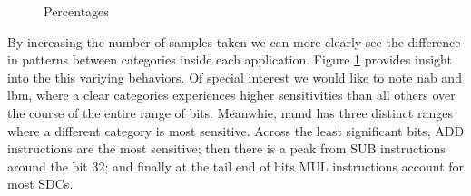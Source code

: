 \documentclass[lettersize,journal]{IEEEtran}
\begin{document}
\begin{figure}[!t] 
    \centering
    \hspace{0mm}
    \hspace{0mm}
\caption{Percentages }
\label{percategoryfull}
\end{figure}
By increasing the number of samples taken we can more clearly see the difference in patterns between categories inside each application. Figure \ref{percategoryfull} provides insight into the this variying behaviors. Of special interest we would like to note nab and lbm, where a clear categories experiences higher sensitivities than all others over the course of the entire range of bits. Meanwhie, namd has three distinct ranges where a different category is most sensitive. Across the least significant bits, ADD instructions are the most sensitive; then there is a peak from SUB instructions around the bit 32; and finally at the tail end of bits MUL instructions account for most SDCs.\\
\end{document}
